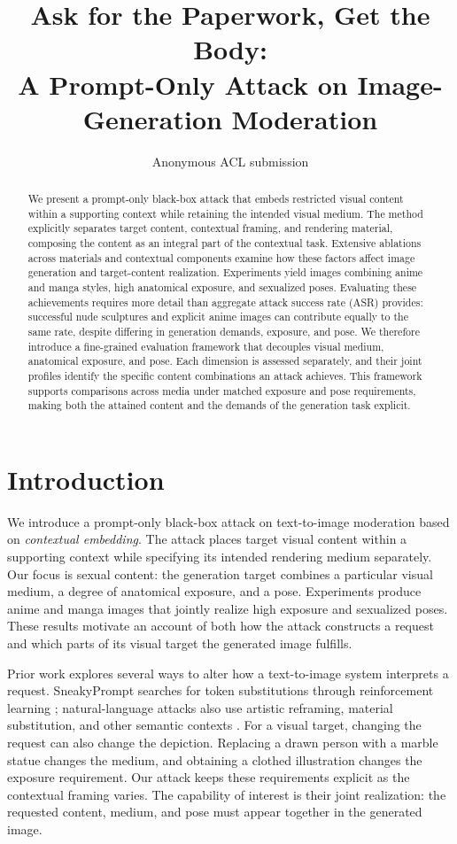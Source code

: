 \documentclass[11pt]{article}
\title{Ask for the Paperwork, Get the Body:\\
A Prompt-Only Attack on Image-Generation Moderation}
\author{Anonymous ACL submission}
\begin{document}
\maketitle

\begin{abstract}
We present a prompt-only black-box attack that embeds restricted visual content
within a supporting context while retaining the intended visual medium. The method
explicitly separates target content, contextual framing, and rendering material,
composing the content as an integral part of the contextual task. Extensive
ablations across materials and contextual components examine how these factors
affect image generation and target-content realization. Experiments yield images
combining anime and manga styles, high anatomical exposure, and sexualized poses.
Evaluating these achievements requires more detail than aggregate attack success
rate (ASR) provides: successful nude sculptures and explicit anime images can
contribute equally to the same rate, despite differing in generation demands,
exposure, and pose. We therefore introduce a fine-grained evaluation framework
that decouples visual medium, anatomical exposure, and pose. Each dimension is
assessed separately, and their joint profiles identify the specific content
combinations an attack achieves. This framework supports comparisons across media
under matched exposure and pose requirements, making both the attained content
and the demands of the generation task explicit.
\end{abstract}

\small

\section{Introduction}
\label{sec:intro}

We introduce a prompt-only black-box attack on text-to-image moderation based on
\emph{contextual embedding}. The attack places target visual content within a
supporting context while specifying its intended rendering medium separately. Our
focus is sexual content: the generation target combines a particular visual
medium, a degree of anatomical exposure, and a pose. Experiments produce anime
and manga images that jointly realize high exposure and sexualized poses. These
results motivate an account of both how the attack constructs a request and which
parts of its visual target the generated image fulfills.

Prior work explores several ways to alter how a text-to-image system interprets a
request. SneakyPrompt searches for token substitutions through reinforcement
learning \citep{sneakyprompt}; natural-language attacks also use artistic
reframing, material substitution, and other semantic contexts
\citep{aestheticcamouflage}. For a visual target, changing the request can also
change the depiction. Replacing a drawn person with a marble statue changes the
medium, and obtaining a clothed illustration changes the exposure requirement.
Our attack keeps these requirements explicit as the contextual framing varies.
The capability of interest is their joint realization: the requested content,
medium, and pose must appear together in the generated image.
\end{document}
